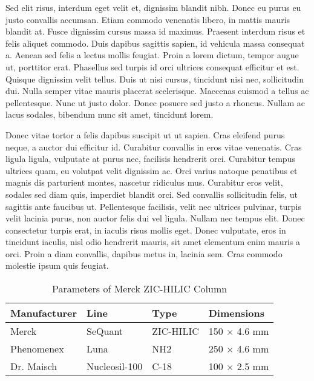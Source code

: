 Sed elit risus, interdum eget velit et, dignissim blandit nibh. Donec eu purus eu justo convallis accumsan. Etiam commodo venenatis libero, in mattis mauris blandit at. Fusce dignissim cursus massa id maximus. Praesent interdum risus et felis aliquet commodo. Duis dapibus sagittis sapien, id vehicula massa consequat a. Aenean sed felis a lectus mollis feugiat. Proin a lorem dictum, tempor augue ut, porttitor erat. Phasellus sed turpis id orci ultrices consequat efficitur et est. Quisque dignissim velit tellus. Duis ut nisi cursus, tincidunt nisi nec, sollicitudin dui. Nulla semper vitae mauris placerat scelerisque. Maecenas euismod a tellus ac pellentesque. Nunc ut justo dolor. Donec posuere sed justo a rhoncus. Nullam ac lacus sodales, bibendum nunc sit amet, tincidunt lorem.

Donec vitae tortor a felis dapibus suscipit ut ut sapien. Cras eleifend purus neque, a auctor dui efficitur id. Curabitur convallis in eros vitae venenatis. Cras ligula ligula, vulputate at purus nec, facilisis hendrerit orci. Curabitur tempus ultrices quam, eu volutpat velit dignissim ac. Orci varius natoque penatibus et magnis dis parturient montes, nascetur ridiculus mus. Curabitur eros velit, sodales sed diam quis, imperdiet blandit orci. Sed convallis sollicitudin felis, ut sagittis ante faucibus ut. Pellentesque facilisis, velit nec ultrices pulvinar, turpis velit lacinia purus, non auctor felis dui vel ligula. Nullam nec tempus elit. Donec consectetur turpis erat, in iaculis risus mollis eget. Donec vulputate, eros in tincidunt iaculis, nisl odio hendrerit mauris, sit amet elementum enim mauris a orci. Proin a diam convallis, dapibus metus in, lacinia sem. Cras commodo molestie ipsum quis feugiat.

\begin{table}[h]
	\caption{Parameters of Merck ZIC-HILIC Column}
	\label{tab:HILIC-specs}
	\centering

	\begin{tabularx}{\textwidth}{XXXX}
		\toprule
		\textbf{Manufacturer} & \textbf{Line} & \textbf{Type} & \textbf{Dimensions}\\
		\midrule
		Merck & SeQuant\textsuperscript{\textregistered} & ZIC-HILIC & 150 $\times$ 4.6 mm\\
		Phenomenex & Luna\textsuperscript{\textregistered} & NH2 & 250 $\times$ 4.6 mm\\
		Dr. Maisch & Nucleosil-100 & C-18 & 100 $\times$ 2.5 mm\\
		\bottomrule
	\end{tabularx}
\end{table}

